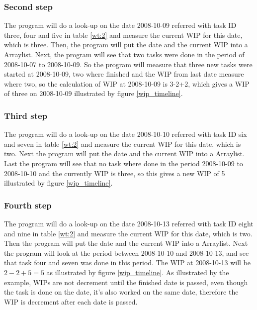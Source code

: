 \documentclass[UKenglish]{ifimaster}  %
\begin{document}
\subsubsection{Second step}
The program will do a look-up on the date 2008-10-09 referred with task ID three, four and five in table \ref{wt:2}  and measure the current WIP for this date, which is three. Then, the program will put the date and the current WIP into a Arraylist.
Next, the program will see that two tasks were done in the period of 2008-10-07 to 2008-10-09. So the program will measure that three new tasks were started at 2008-10-09, two where finished and the WIP from last date measure where two, so the calculation of WIP at 2008-10-09 is 3-2+2, which gives a WIP of three on 2008-10-09 illustrated by figure \ref{wip_timeline}. 

\subsubsection{Third step}
The program will do a look-up on the date 2008-10-10 referred with task ID six and seven in table \ref{wt:2}  and measure the current WIP for this date, which is two. Next the program will put the date and the current WIP into a Arraylist.
Last the program will see that no task where done in the period 2008-10-09 to 2008-10-10 and the currently WIP is three, so this gives a new WIP of 5 illustrated by figure \ref{wip_timeline}. 

\subsubsection{Fourth step}
The program will do a look-up on the date 2008-10-13 referred with task ID eight and nine in table \ref{wt:2}  and measure the current WIP for this date, which is two. Then the program will put the date and the current WIP into a Arraylist. 
Next the program will look at the period between 2008-10-10 and 2008-10-13, and see that task four and seven was done in this period. The WIP at 2008-10-13 will be $2-2+5 = 5$ as illustrated by figure \ref{wip_timeline}. 
As illustrated by the example, WIPs are not decrement until the finished date is passed, even though the task is done on the date, it's also worked on the same date, therefore the WIP is decrement after each date is passed.
\fi



\newpage
\end{document}

